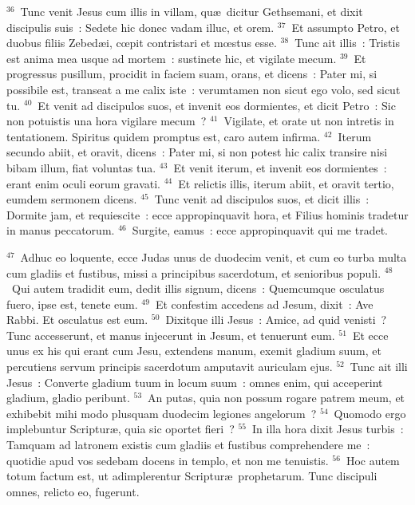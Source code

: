 ${}^{36}$~Tunc venit Jesus cum illis in villam, qu\ae\ dicitur Gethsemani, et dixit discipulis suis~: Sedete hic donec vadam illuc, et orem.
${}^{37}$~Et assumpto Petro, et duobus filiis Zebed\ae i, cœpit contristari et mœstus esse.
${}^{38}$~Tunc ait illis~: Tristis est anima mea usque ad mortem~: sustinete hic, et vigilate mecum.
${}^{39}$~Et progressus pusillum, procidit in faciem suam, orans, et dicens~: Pater mi, si possibile est, transeat a me calix iste~: verumtamen non sicut ego volo, sed sicut tu.
${}^{40}$~Et venit ad discipulos suos, et invenit eos dormientes, et dicit Petro~: Sic non potuistis una hora vigilare mecum~?
${}^{41}$~Vigilate, et orate ut non intretis in tentationem. Spiritus quidem promptus est, caro autem infirma.
${}^{42}$~Iterum secundo abiit, et oravit, dicens~: Pater mi, si non potest hic calix transire nisi bibam illum, fiat voluntas tua.
${}^{43}$~Et venit iterum, et invenit eos dormientes~: erant enim oculi eorum gravati.
${}^{44}$~Et relictis illis, iterum abiit, et oravit tertio, eumdem sermonem dicens.
${}^{45}$~Tunc venit ad discipulos suos, et dicit illis~: Dormite jam, et requiescite~: ecce appropinquavit hora, et Filius hominis tradetur in manus peccatorum.
${}^{46}$~Surgite, eamus~: ecce appropinquavit qui me tradet.


${}^{47}$~Adhuc eo loquente, ecce Judas unus de duodecim venit, et cum eo turba multa cum gladiis et fustibus, missi a principibus sacerdotum, et senioribus populi.
${}^{48}$~Qui autem tradidit eum, dedit illis signum, dicens~: Quemcumque osculatus fuero, ipse est, tenete eum.
${}^{49}$~Et confestim accedens ad Jesum, dixit~: Ave Rabbi. Et osculatus est eum.
${}^{50}$~Dixitque illi Jesus~: Amice, ad quid venisti~? Tunc accesserunt, et manus injecerunt in Jesum, et tenuerunt eum.
${}^{51}$~Et ecce unus ex his qui erant cum Jesu, extendens manum, exemit gladium suum, et percutiens servum principis sacerdotum amputavit auriculam ejus.
${}^{52}$~Tunc ait illi Jesus~: Converte gladium tuum in locum suum~: omnes enim, qui acceperint gladium, gladio peribunt.
${}^{53}$~An putas, quia non possum rogare patrem meum, et exhibebit mihi modo plusquam duodecim legiones angelorum~?
${}^{54}$~Quomodo ergo implebuntur Scriptur\ae , quia sic oportet fieri~?
${}^{55}$~In illa hora dixit Jesus turbis~: Tamquam ad latronem existis cum gladiis et fustibus comprehendere me~: quotidie apud vos sedebam docens in templo, et non me tenuistis.
${}^{56}$~Hoc autem totum factum est, ut adimplerentur Scriptur\ae\ prophetarum. Tunc discipuli omnes, relicto eo, fugerunt.


